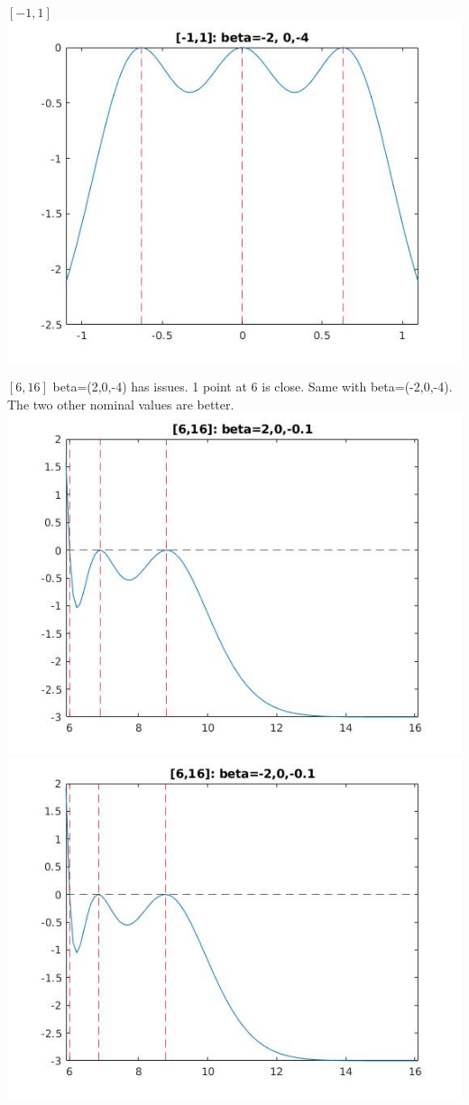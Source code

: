 \documentclass[11pt]{beamer}
\begin{document}
\begin{frame}{$[-1, 1]$}
\includegraphics[scale=0.2]{quadplots/11_4.jpg}
\end{frame}

\begin{frame}{$[6,16]$}
beta=(2,0,-4) has issues. 1 point at 6 is close. Same with beta=(-2,0,-4). The two other nominal values are better.
\includegraphics[scale=0.28]{quadplots/616_1.jpg}
\includegraphics[scale=0.28]{quadplots/616_3.jpg}
\end{frame}
\end{document}
